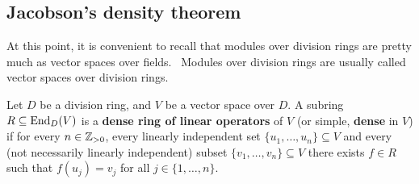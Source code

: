 %
%


\subsection{Jacobson's density theorem}

At this point, it is convenient to recall that
modules over division rings are pretty much as vector spaces over fields. 
Modules over division rings are usually called vector spaces over division rings. 

\begin{definition}
	Let $D$ be a division ring, and $V$ be a vector space over $D$. A subring 
	$R\subseteq\operatorname{End}_D(V)$ is a \textbf{dense ring of linear operators} 
	of $V$ (or simple, \textbf{dense} in $V$) if for every  
	$n\in\mathbb{Z}_{>0}$, every linearly independent set $\{u_1,\dots,u_n\}\subseteq V$ 
	and every (not necessarily linearly independent) subset $\{v_1,\dots,v_n\}\subseteq V$ 
	there exists $f\in R$ such that $f(u_j)=v_j$ for all 
	$j\in\{1,\dots,n\}$.
\end{definition}

